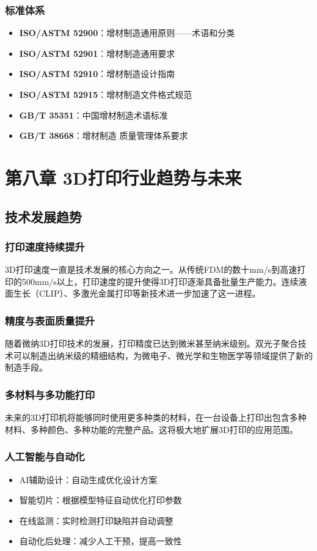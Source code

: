 \documentclass[12pt,UTF8]{ctexbook}
\begin{document}
\subsection{标准体系}
\begin{itemize}
\item \textbf{ISO/ASTM 52900}：增材制造通用原则——术语和分类
\item \textbf{ISO/ASTM 52901}：增材制造通用要求
\item \textbf{ISO/ASTM 52910}：增材制造设计指南
\item \textbf{ISO/ASTM 52915}：增材制造文件格式规范
\item \textbf{GB/T 35351}：中国增材制造术语标准
\item \textbf{GB/T 38668}：增材制造 质量管理体系要求
\end{itemize}

\chapter{第八章 3D打印行业趋势与未来}

\section{技术发展趋势}

\subsection{打印速度持续提升}
3D打印速度一直是技术发展的核心方向之一。从传统FDM的数十mm/s到高速打印的500mm/s以上，打印速度的提升使得3D打印逐渐具备批量生产能力。连续液面生长（CLIP）、多激光金属打印等新技术进一步加速了这一进程。

\subsection{精度与表面质量提升}
随着微纳3D打印技术的发展，打印精度已达到微米甚至纳米级别。双光子聚合技术可以制造出纳米级的精细结构，为微电子、微光学和生物医学等领域提供了新的制造手段。

\subsection{多材料与多功能打印}
未来的3D打印机将能够同时使用更多种类的材料，在一台设备上打印出包含多种材料、多种颜色、多种功能的完整产品。这将极大地扩展3D打印的应用范围。

\subsection{人工智能与自动化}
\begin{itemize}
\item AI辅助设计：自动生成优化设计方案
\item 智能切片：根据模型特征自动优化打印参数
\item 在线监测：实时检测打印缺陷并自动调整
\item 自动化后处理：减少人工干预，提高一致性
\end{itemize}
\end{document}
